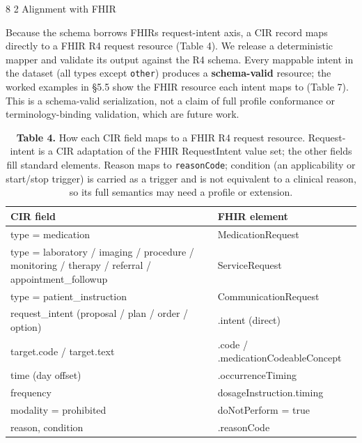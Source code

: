 \documentclass[3p,twocolumn]{elsarticle}
\makeatletter
\renewcommand\subsection{\@startsection{subsection}{2}{\z@}%
    {8\p@ \@plus 4\p@ \@minus 4\p@}%
    {2\p@ \@plus 4\p@ \@minus 3\p@}%
    {\normalfont\normalsize\itshape}}
\makeatother
\begin{document}
\subsection{Alignment with FHIR}\label{alignment-with-fhir}

Because the schema borrows FHIR\textquotesingle s request-intent axis, a CIR record maps directly to a FHIR R4 request resource (Table 4). We release a deterministic mapper and validate its output against the R4 schema. Every mappable intent in the dataset (all types except \texttt{other}) produces a \textbf{schema-valid} resource; the worked examples in §5.5 show the FHIR resource each intent maps to (Table 7). This is a schema-valid serialization, not a claim of full profile conformance or terminology-binding validation, which are future work.

\begin{table}[ht]
\centering
\small\setlength{\tabcolsep}{4pt}%
\setlength{\tabcolsep}{4pt}
\begin{tabularx}{\linewidth}{>{\hsize=1.311\hsize\raggedright\arraybackslash}X >{\hsize=0.689\hsize\raggedright\arraybackslash}X}
\toprule
CIR field & FHIR element \\
\midrule
type = medication & MedicationRequest \\
type = laboratory / imaging / procedure / monitoring / therapy / referral / appointment\_\allowbreak{}followup & ServiceRequest \\
type = patient\_\allowbreak{}instruction & CommunicationRequest \\
request\_\allowbreak{}intent (proposal / plan / order / option) & .intent (direct) \\
target.code / target.text & .code / .medicationCodeableConcept \\
time (day offset) & .occurrenceTiming \\
frequency & dosageInstruction.timing \\
modality = prohibited & doNotPerform = true \\
reason, condition & .reasonCode \\
\bottomrule
\end{tabularx}
\caption{\textbf{Table 4.} How each CIR field maps to a FHIR R4 request resource. Request-intent is a CIR adaptation of the FHIR RequestIntent value set; the other fields fill standard elements. Reason maps to \texttt{reasonCode}; condition (an applicability or start/stop trigger) is carried as a trigger and is not equivalent to a clinical reason, so its full semantics may need a profile or extension.}
\end{table}
\end{document}
